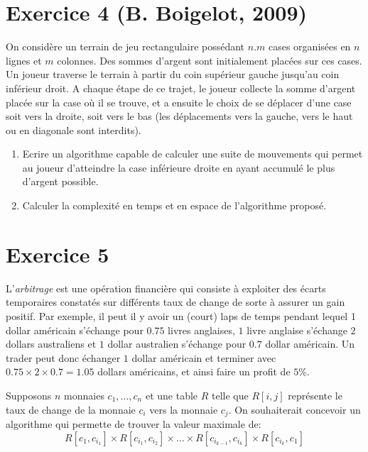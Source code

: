 \documentclass[a4paper,10pt]{article}
\begin{document}
\section*{Exercice 4 (B. Boigelot, 2009)}

On considère un terrain de jeu rectangulaire possédant $n.m$ cases organisées en
$n$ lignes et $m$ colonnes. Des sommes d'argent sont initialement placées sur
ces cases. Un joueur traverse le terrain à partir du coin supérieur gauche
jusqu'au coin inférieur droit. A chaque étape de ce trajet, le joueur collecte
la somme d'argent placée sur la case où il se trouve, et a ensuite le choix de
se déplacer d'une case soit vers la droite, soit vers le bas (les déplacements
vers la gauche, vers le haut ou en diagonale sont interdits).

\begin{enumerate}
\item Ecrire un algorithme capable de calculer une suite de mouvements qui
permet au joueur d'atteindre la case inférieure droite en ayant accumulé le
plus d'argent possible.
\item Calculer la complexité en temps et en espace de l'algorithme proposé.
\end{enumerate}


\section*{Exercice 5}


L'\textit{arbitrage} est une opération financière qui consiste à exploiter des
écarts temporaires constatés sur différents taux de change de sorte à assurer un
gain positif. Par exemple, il peut il y avoir un (court) laps de temps pendant
lequel 1 dollar américain s'échange pour $0.75$ livres anglaises, $1$ livre
anglaise s'échange $2$ dollars australiens et $1$ dollar australien s'échange
pour $0.7$ dollar américain. Un trader peut donc échanger $1$ dollar
américain et terminer avec $0.75 \times 2 \times 0.7=1.05$ dollars américains,
et ainsi faire un profit de $5\%$.

Supposons $n$ monnaies $c_1, ..., c_n$ et une table $R$ telle que $R[i,j]$
représente le taux de change de la monnaie $c_i$ vers la monnaie $c_j$.  On
souhaiterait concevoir un algorithme qui permette de trouver la valeur maximale
de: $$R[c_1, c_{i_1}] \times R[c_{i_1}, c_{i_2}] \times ... \times
R[c_{i_{k-1}}, c_{i_k}] \times R[c_{i_k}, c_{1}]   $$
\end{document}
